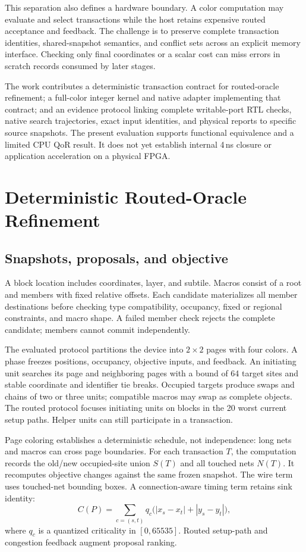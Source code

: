 \documentclass[conference,10pt]{IEEEtran}
\begin{document}
This separation also defines a hardware boundary. A color computation may
evaluate and select transactions while the host retains expensive routed
acceptance and feedback. The challenge is to preserve complete transaction
identities, shared-snapshot semantics, and conflict sets across an explicit
memory interface. Checking only final coordinates or a scalar cost can miss
errors in scratch records consumed by later stages.

The work contributes a deterministic transaction contract for routed-oracle
refinement; a full-color integer kernel and native adapter implementing that
contract; and an evidence protocol linking complete writable-port RTL checks,
native search trajectories, exact input identities, and physical reports to
specific source snapshots. The present evaluation supports functional
equivalence and a limited CPU QoR result. It does not yet establish internal
4\,ns closure or application acceleration on a physical FPGA.

\section{Deterministic Routed-Oracle Refinement}

\subsection{Snapshots, proposals, and objective}

A block location includes coordinates, layer, and subtile. Macros consist of
a root and members with fixed relative offsets. Each candidate materializes
all member destinations before checking type compatibility, occupancy,
fixed or regional constraints, and macro shape. A failed member check rejects
the complete candidate; members cannot commit independently.

The evaluated protocol partitions the device into $2\times2$ pages with four
colors. A phase freezes positions, occupancy, objective inputs, and feedback.
An initiating unit searches its page and neighboring pages with a bound of
64 target sites and stable coordinate and identifier tie breaks. Occupied
targets produce swaps and chains of two or three units; compatible macros
may swap as complete objects. The routed protocol focuses initiating units
on blocks in the 20 worst current setup paths. Helper units can still
participate in a transaction.

Page coloring establishes a deterministic schedule, not independence:
long nets and macros can cross page boundaries. For each transaction $T$,
the computation records the old/new occupied-site union $S(T)$ and all
touched nets $N(T)$. It recomputes objective changes against the same frozen
snapshot. The wire term uses touched-net bounding boxes. A connection-aware
timing term retains sink identity:
\begin{equation}
C(P)=\sum_{c=(s,t)}q_c\bigl(|x_s-x_t|+|y_s-y_t|\bigr),
\end{equation}
where $q_c$ is a quantized criticality in $[0,65535]$.
Routed setup-path and congestion feedback augment proposal ranking.
\end{document}
